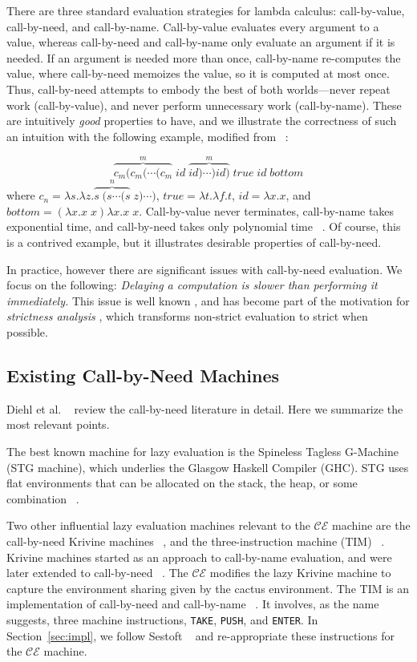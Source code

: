 There are three standard evaluation strategies for lambda calculus:
call-by-value, call-by-need, and call-by-name. Call-by-value evaluates every argument
to a value, whereas call-by-need and call-by-name only evaluate an argument if
it is needed.  If an argument is needed more than once, call-by-name re-computes
the value, where call-by-need memoizes the value, so it is computed at most once.
Thus, call-by-need attempts to embody the best of both worlds---never repeat
work (call-by-value), and never perform unnecessary work (call-by-name). These
are intuitively \emph{good} properties to have, and we illustrate the
correctness of such an intuition with the following example, modified from
~\cite{danvy2013synthetic}:

$$ \overbrace{c_m (c_m (\cdots(c_m}^{m} \; id \; \overbrace{id)\cdots) id)}^{m} \; true \; id
\; bottom $$ where $c_n = \lambda s.\lambda z.\overbrace{s \; (s \cdots (s}^{n}
\; z) \cdots) $, $true = \lambda t.\lambda f.t$, $id=\lambda x.x$, and $bottom =
(\lambda x.x \; x) \lambda x.x \; x$. Call-by-value never terminates,
call-by-name takes exponential time, and call-by-need takes only polynomial time
~\cite{danvy2013synthetic}. Of course, this is a contrived example, but it
illustrates desirable properties of call-by-need.

In practice, however there are significant issues with call-by-need evaluation.
We focus on the following: \emph{Delaying a computation is slower than
performing it immediately.} This issue is well known
\cite{johnsson1984efficient,jonesstg}, and has become part of the motivation
for \emph{strictness analysis}
\cite{mycroft1982abstract,wadler1987projections}, which transforms non-strict
evaluation to strict when possible.

\subsection{Existing Call-by-Need Machines}

Diehl et al. ~\cite{diehl2000abstract} review the call-by-need
literature in detail.  Here we summarize the most relevant points.

The best known machine for lazy evaluation is the Spineless Tagless
G-Machine (STG machine), which underlies the Glasgow Haskell Compiler (GHC). 
STG uses flat environments that can be allocated on the stack, the heap,
or some combination ~\cite{jonesstg}.  

Two other influential lazy evaluation machines relevant to the $\mathcal{CE}$
machine are the call-by-need Krivine machines
~\cite{lkm,krivine2007call,sestoft}, and the three-instruction machine (TIM)
~\cite{TIM}.  Krivine machines started as an approach to call-by-name
evaluation, and were later extended to call-by-need
~\cite{krivine2007call,sestoft,danvy2013synthetic,lkm}.  The $\mathcal{CE}$
modifies the lazy Krivine machine to capture the environment sharing given by
the cactus environment. The TIM is an implementation of call-by-need and
call-by-name ~\cite{TIM}.  It involves, as the name suggests, three machine
instructions, \texttt{TAKE}, \texttt{PUSH}, and \texttt{ENTER}. In
Section~\ref{sec:impl}, we follow Sestoft ~\cite{sestoft} and
re-appropriate these instructions for the $\mathcal{CE}$ machine.

